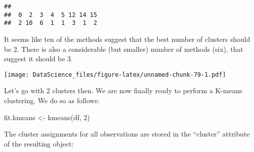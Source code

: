 \documentclass[
]{book}
\newenvironment{Shaded}{\begin{snugshade}}{\end{snugshade}}
\newcommand{\AttributeTok}[1]{\textcolor[rgb]{0.77,0.63,0.00}{#1}}
\newcommand{\DecValTok}[1]{\textcolor[rgb]{0.00,0.00,0.81}{#1}}
\newcommand{\FunctionTok}[1]{\textcolor[rgb]{0.00,0.00,0.00}{#1}}
\newcommand{\NormalTok}[1]{#1}
\newcommand{\OtherTok}[1]{\textcolor[rgb]{0.56,0.35,0.01}{#1}}
\newcommand{\SpecialCharTok}[1]{\textcolor[rgb]{0.00,0.00,0.00}{#1}}
\newcommand{\StringTok}[1]{\textcolor[rgb]{0.31,0.60,0.02}{#1}}
\begin{document}
\begin{Shaded}
\end{Shaded}

\begin{verbatim}
## 
##  0  2  3  4  5 12 14 15 
##  2 10  6  1  1  3  1  2
\end{verbatim}

It seems like ten of the methods suggest that the best number of clusters should be 2. There is also a considerable (but smaller) number of methods (six), that suggest it should be 3.

\begin{Shaded}
\end{Shaded}

\texttt{[image: DataScience\_files/figure-latex/unnamed-chunk-79-1.pdf]}

Let's go with 2 clusters then. We are now finally ready to perform a K-means clustering. We do so as follows:

\begin{Shaded}
\begin{Highlighting}[]
\NormalTok{fit.kmeans }\OtherTok{\textless{}{-}} \FunctionTok{kmeans}\NormalTok{(df, }\DecValTok{2}\NormalTok{)}
\end{Highlighting}
\end{Shaded}

The cluster assignments for all observations are stored in the ``cluster'' attribute of the resulting object:

\begin{Shaded}
\end{Shaded}
\end{document}
